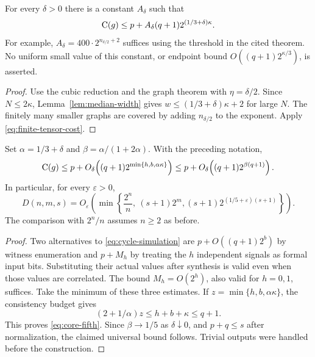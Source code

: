 \begin{theorem}
\label{thm:cycle-simulation}
For every $\delta>0$ there is a constant $A_\delta$ such that
\begin{equation}\label{eq:cycle-simulation}
 \mathrm{C}(g)\le p+A_\delta(q+1)2^{(1/3+\delta)\kappa}.
\end{equation}
For example, $A_\delta=400\cdot2^{n_{\delta/2}+2}$ suffices using
the threshold in the cited theorem. No uniform small value of this
constant, or endpoint bound $O((q+1)2^{\kappa/3})$, is asserted.
\end{theorem}
\begin{proof}
Use the cubic reduction and the graph theorem with $\eta=\delta/2$.
Since $N\le2\kappa$, Lemma~\ref{lem:median-width} gives
$w\le(1/3+\delta)\kappa+2$ for large $N$. The finitely many smaller
graphs are covered by adding $n_{\delta/2}$ to the exponent. Apply
\eqref{eq:finite-tensor-cost}.
\end{proof}

\begin{theorem}\label{thm:fifth}
Set $\alpha=1/3+\delta$ and $\beta=\alpha/(1+2\alpha)$.
With the preceding notation,
\begin{equation}\label{eq:core-fifth}
 \mathrm{C}(g)\le p+O_\delta\!\left((q+1)
                    2^{\min\{h,b,\alpha\kappa\}}\right)
 \le p+O_\delta\!\left((q+1)2^{\beta(q+1)}\right).
\end{equation}
In particular, for every $\varepsilon>0$,
\begin{equation}\label{eq:fifth}
 \boxed{\quad
 D(n,m,s)=O_\varepsilon\!\left(
  \min\left\{\frac{2^n}{n},\ (s+1)2^m,
       (s+1)2^{(1/5+\varepsilon)(s+1)}\right\}\right).
 \quad}
\end{equation}
The comparison with $2^n/n$ assumes $n\ge2$ as before.
\end{theorem}
\begin{proof}
Two alternatives to \eqref{eq:cycle-simulation} are
$p+O((q+1)2^b)$ by witness enumeration and $p+M_h$ by treating
the $h$ independent signals as formal input bits. Substituting their
actual values after synthesis is valid even when those values are
correlated. The bound $M_h=O(2^h)$, also valid for $h=0,1$, suffices.
Take the minimum of these three estimates. If
$z=\min\{h,b,\alpha\kappa\}$, the consistency budget gives
\[
 (2+1/\alpha)z\le h+b+\kappa\le q+1.
\]
This proves \eqref{eq:core-fifth}. Since $\beta\to1/5$ as
$\delta\downarrow0$, and $p+q\le s$ after normalization, the
claimed universal bound follows. Trivial outputs were handled before
the construction.
\end{proof}

